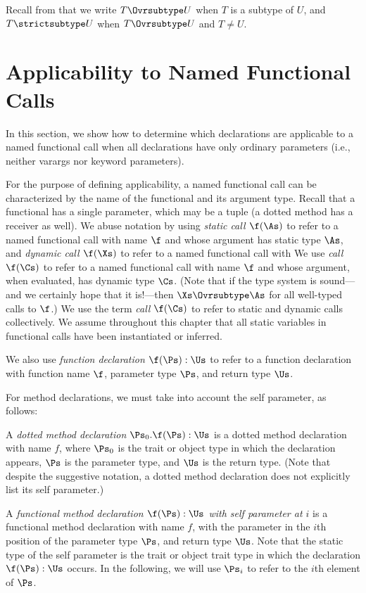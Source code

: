 Recall from  that we write
$T \Ovrsubtype U$ when $T$ is a subtype of $U$,
and $T \strictsubtype U$ when $T \Ovrsubtype U$ and $T \neq U$.


\section{Applicability to Named Functional Calls}
In this section, we show how to determine which declarations are
applicable to a named functional call when all declarations have only
ordinary parameters (i.e., neither varargs nor keyword parameters).

For the purpose of defining applicability, a named functional call can
be characterized by the name of the functional and its argument type.
Recall that a functional has a single parameter, which may be a tuple
(a dotted method has a receiver as well).
 We abuse notation by using
\emph{static call $\f(\As)$} to refer to a named functional call with
name $\f$ and whose argument has static type $\As$, and
\emph{dynamic call $\f(\Xs)$} to refer to a named functional call with
We use \emph{call $\f(\Cs)$} to refer to a named functional call with
name $\f$ and whose argument, when evaluated, has dynamic type $\Cs$.
(Note that if the type system is sound---and we certainly hope that
it is!---then $\Xs \Ovrsubtype \As$ for all well-typed calls to $\f$.)
We use the term \emph{call $\f(\Cs)$} to refer to static and dynamic calls
collectively.
We assume throughout this chapter that all static variables in functional calls
have been instantiated or inferred.


We also use \emph{function declaration $\f(\Ps):\Us$} to refer to a
function declaration with function name $\f$, parameter type $\Ps$,
and return type $\Us$.


For method declarations, we must take into account the self parameter,
as follows:

A \emph{dotted method declaration $\Ps_0.\f(\Ps):\Us$} is a dotted
method declaration with name $f$, where $\Ps_0$ is the trait or object
type in which the declaration appears, $\Ps$ is the parameter type,
and $\Us$ is the return type.  (Note that despite the suggestive
notation, a dotted method declaration does not explicitly list its
self parameter.)

A \emph{functional method declaration $\f(\Ps):\Us$ with self
parameter at $i$} is a functional method declaration with name $f$,
with the parameter  in the $i$th position
of the parameter type $\Ps$, and return type $\Us$.  Note that the static
type of the self parameter is the trait or object trait type in which
the declaration $\f(\Ps):\Us$ occurs.  In the following, we will use
$\Ps_i$ to refer to the $i$th element of $\Ps$.


